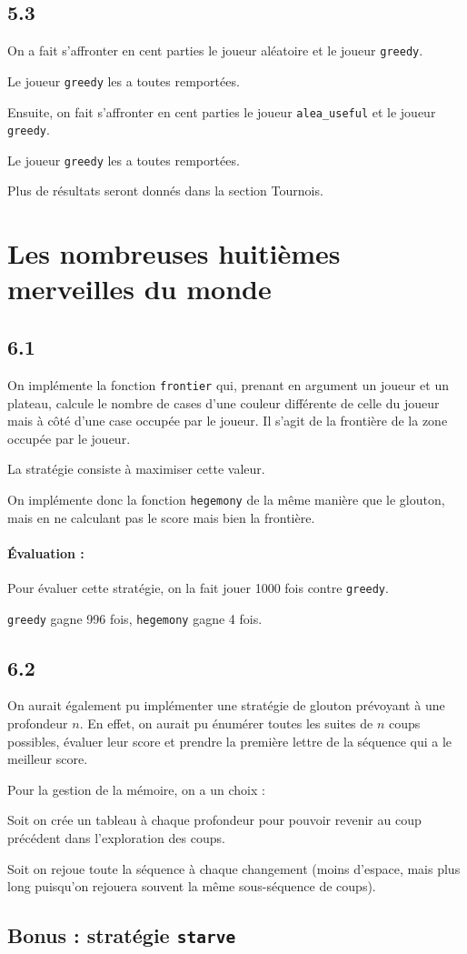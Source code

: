 \documentclass[12pt]{article}
\def\question#1{\subsection*{#1}}
\def\sec#1{\section{#1}}
\begin{document}
\question{5.3}
On a fait s'affronter en cent parties le joueur aléatoire et le joueur \texttt{greedy}.

Le joueur \texttt{greedy} les a toutes remportées.

Ensuite, on fait s'affronter en cent parties le joueur \texttt{alea\_useful} et le joueur \texttt{greedy}.

Le joueur \texttt{greedy} les a toutes remportées.

Plus de résultats seront donnés dans la section Tournois.

\sec{Les nombreuses huitièmes merveilles du monde}

\question{6.1}
On implémente la fonction \texttt{frontier} qui, prenant en argument un joueur et un plateau, calcule le nombre de cases d'une couleur différente de celle du joueur mais à côté d'une case occupée par le joueur.
Il s'agit de la frontière de la zone occupée par le joueur.

La stratégie consiste à maximiser cette valeur.

On implémente donc la fonction \texttt{hegemony} de la même manière que le glouton, mais en ne calculant pas le score mais bien la frontière.

\paragraph{Évaluation :}
Pour évaluer cette stratégie, on la fait jouer 1000 fois contre \texttt{greedy}.

\texttt{greedy} gagne 996 fois, \texttt{hegemony} gagne 4 fois.


\question{6.2}
On aurait également pu implémenter une stratégie de glouton prévoyant à une profondeur $n$. En effet, on aurait pu énumérer toutes les suites de $n$ coups possibles, évaluer leur score et prendre la première lettre de la séquence qui a le meilleur score.

Pour la gestion de la mémoire, on a un choix :

Soit on crée un tableau à chaque profondeur pour pouvoir revenir au coup précédent dans l'exploration des coups.

Soit on rejoue toute la séquence à chaque changement (moins d'espace, mais plus long puisqu'on rejouera souvent la même sous-séquence de coups).


\question{Bonus : stratégie \texttt{starve}}
\end{document}
